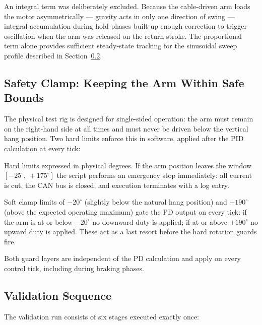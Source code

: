 \documentclass[12pt,a4paper]{article}
\begin{document}
An integral term was deliberately excluded.  Because the cable-driven
arm loads the motor asymmetrically --- gravity acts in only one direction
of swing --- integral accumulation during hold phases built up enough
correction to trigger oscillation when the arm was released on the return
stroke.  The proportional term alone provides sufficient steady-state
tracking for the sinusoidal sweep profile described in
Section~\ref{sec:sequence}.

\subsection{Safety Clamp: Keeping the Arm Within Safe Bounds}

The physical test rig is designed for single-sided operation: the arm must
remain on the right-hand side at all times and must never be driven below
the vertical hang position.  Two hard limits enforce this in software,
applied after the PID calculation at every tick:

\begin{description}[leftmargin=4.2cm, style=nextline]
  \item[Rotation guards]
    Hard limits expressed in physical degrees.  If the arm position
    leaves the window $[-25^\circ,\,+175^\circ]$ the script performs an
    emergency stop immediately: all current is cut, the CAN bus is
    closed, and execution terminates with a log entry.

  \item[Physical soft limits]
    Soft clamp limits of $-20^\circ$ (slightly below the natural hang
    position) and $+190^\circ$ (above the expected operating maximum)
    gate the PD output on every tick: if the arm is at or below
    $-20^\circ$ no downward duty is applied; if at or above
    $+190^\circ$ no upward duty is applied.  These act as a last
    resort before the hard rotation guards fire.
\end{description}

Both guard layers are independent of the PD calculation and apply on
every control tick, including during braking phases.

\subsection{Validation Sequence}
\label{sec:sequence}

The validation run consists of six stages executed exactly once:
\end{document}
